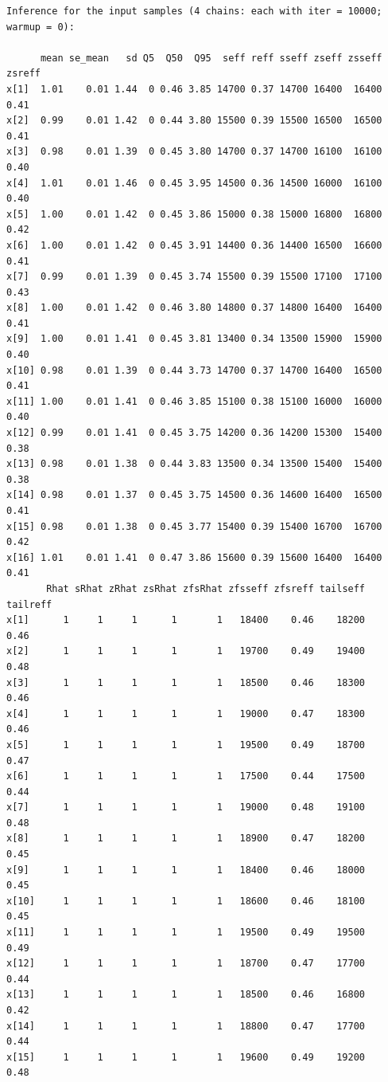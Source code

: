 \documentclass[american,]{article}
\begin{document}
\begin{verbatim}
Inference for the input samples (4 chains: each with iter = 10000; warmup = 0):

      mean se_mean   sd Q5  Q50  Q95  seff reff sseff zseff zsseff zsreff
x[1]  1.01    0.01 1.44  0 0.46 3.85 14700 0.37 14700 16400  16400   0.41
x[2]  0.99    0.01 1.42  0 0.44 3.80 15500 0.39 15500 16500  16500   0.41
x[3]  0.98    0.01 1.39  0 0.45 3.80 14700 0.37 14700 16100  16100   0.40
x[4]  1.01    0.01 1.46  0 0.45 3.95 14500 0.36 14500 16000  16100   0.40
x[5]  1.00    0.01 1.42  0 0.45 3.86 15000 0.38 15000 16800  16800   0.42
x[6]  1.00    0.01 1.42  0 0.45 3.91 14400 0.36 14400 16500  16600   0.41
x[7]  0.99    0.01 1.39  0 0.45 3.74 15500 0.39 15500 17100  17100   0.43
x[8]  1.00    0.01 1.42  0 0.46 3.80 14800 0.37 14800 16400  16400   0.41
x[9]  1.00    0.01 1.41  0 0.45 3.81 13400 0.34 13500 15900  15900   0.40
x[10] 0.98    0.01 1.39  0 0.44 3.73 14700 0.37 14700 16400  16500   0.41
x[11] 1.00    0.01 1.41  0 0.46 3.85 15100 0.38 15100 16000  16000   0.40
x[12] 0.99    0.01 1.41  0 0.45 3.75 14200 0.36 14200 15300  15400   0.38
x[13] 0.98    0.01 1.38  0 0.44 3.83 13500 0.34 13500 15400  15400   0.38
x[14] 0.98    0.01 1.37  0 0.45 3.75 14500 0.36 14600 16400  16500   0.41
x[15] 0.98    0.01 1.38  0 0.45 3.77 15400 0.39 15400 16700  16700   0.42
x[16] 1.01    0.01 1.41  0 0.47 3.86 15600 0.39 15600 16400  16400   0.41
       Rhat sRhat zRhat zsRhat zfsRhat zfsseff zfsreff tailseff tailreff
x[1]      1     1     1      1       1   18400    0.46    18200     0.46
x[2]      1     1     1      1       1   19700    0.49    19400     0.48
x[3]      1     1     1      1       1   18500    0.46    18300     0.46
x[4]      1     1     1      1       1   19000    0.47    18300     0.46
x[5]      1     1     1      1       1   19500    0.49    18700     0.47
x[6]      1     1     1      1       1   17500    0.44    17500     0.44
x[7]      1     1     1      1       1   19000    0.48    19100     0.48
x[8]      1     1     1      1       1   18900    0.47    18200     0.45
x[9]      1     1     1      1       1   18400    0.46    18000     0.45
x[10]     1     1     1      1       1   18600    0.46    18100     0.45
x[11]     1     1     1      1       1   19500    0.49    19500     0.49
x[12]     1     1     1      1       1   18700    0.47    17700     0.44
x[13]     1     1     1      1       1   18500    0.46    16800     0.42
x[14]     1     1     1      1       1   18800    0.47    17700     0.44
x[15]     1     1     1      1       1   19600    0.49    19200     0.48

\end{verbatim}
\end{document}
